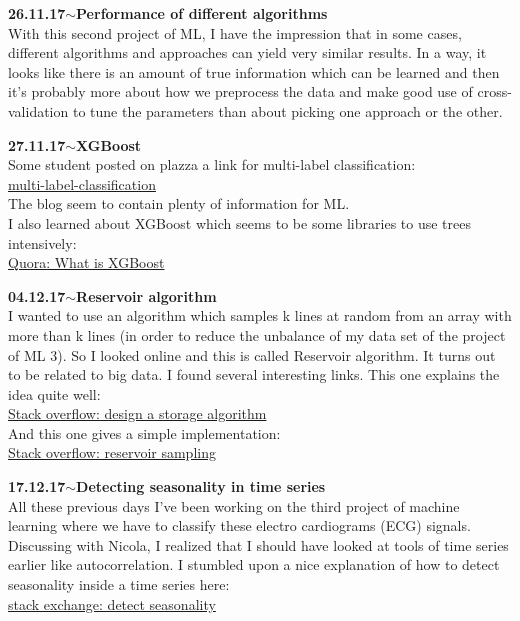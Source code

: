 \documentclass[11pt,a4paper]{article}
\newenvironment{loggentry}[2]%
{\noindent\textbf{#1}\hspace{1cm}$\mathbf{\sim}$\text{ }\textbf{#2}\\}{\vspace{0.5cm}}
\begin{document}
\begin{loggentry}{26.11.17}{Performance of different algorithms}
With this second project of ML, I have the impression that in some cases, different algorithms and approaches can yield very similar results. In a way, it looks like there is an amount of true information which can be learned and then it's probably more about how we preprocess the data and make good use of cross-validation to tune the parameters than about picking one approach or the other.
\end{loggentry}

\begin{loggentry}{27.11.17}{XGBoost}
Some student posted on plazza a link for multi-label classification:\\
\href{https://www.analyticsvidhya.com/blog/2017/08/introduction-to-multi-label-classification/}{multi-label-classification}\\
The blog seem to contain plenty of information for ML.\\
I also learned about XGBoost which seems to be some libraries to use trees intensively:\\
\href{https://www.quora.com/What-is-xgboost}{Quora: What is XGBoost}
\end{loggentry}

\begin{loggentry}{04.12.17}{Reservoir algorithm}
I wanted to use an algorithm which samples k lines at random from an array with more than k lines (in order to reduce the unbalance of my data set of the project of ML 3). So I looked online and this is called Reservoir algorithm. It turns out to be related to big data. I found several interesting links. This one explains the idea quite well:\\
\href{https://stackoverflow.com/questions/12732982/design-a-storage-algorithm/12733515#12733515}{Stack overflow: design a storage algorithm}\\
And this one gives a simple implementation:\\
\href{https://stackoverflow.com/questions/2612648/reservoir-sampling}{Stack overflow: reservoir sampling}
\end{loggentry}

\begin{loggentry}{17.12.17}{Detecting seasonality in time series}
All these previous days I've been working on the third project of machine learning where we have to classify these electro cardiograms (ECG) signals. Discussing with Nicola, I realized that I should have looked at tools of time series earlier like autocorrelation. I stumbled upon a nice explanation of how to detect seasonality inside a time series here:\\
\href{https://stats.stackexchange.com/questions/16117/what-method-can-be-used-to-detect-seasonality-in-data#16169}{stack exchange: detect seasonality}
\end{loggentry}
\end{document}
